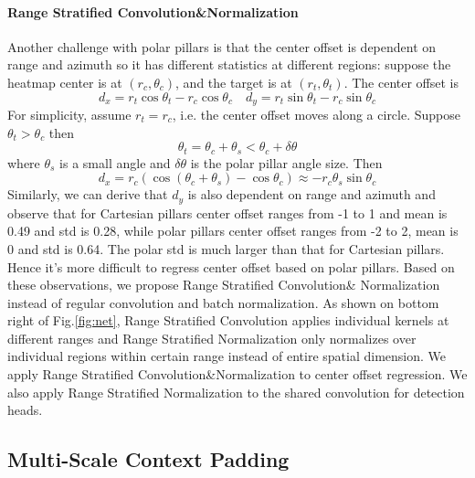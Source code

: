 \documentclass{article}
\begin{document}
\vspace{-3.5mm}\paragraph{Range Stratified Convolution\&Normalization}\label{stratum}
Another challenge with polar pillars is that the center offset is dependent on range and azimuth so it has different statistics at different regions: suppose the heatmap center is at $(r_c, \theta_c)$, and the target is at $(r_t, \theta_t)$. The center offset is 
\vspace{-1mm}\begin{equation}
d_x = r_t \cos \theta_t - r_c \cos \theta_c \quad
d_y = r_t \sin \theta_t - r_c \sin \theta_c
\end{equation}\vspace{-2mm}
For simplicity, assume $r_t = r_c$, i.e. the center offset moves along a circle. Suppose $\theta_t > \theta_c$ then 
\begin{equation}
\theta_t = \theta_c + \theta_s < \theta_c + \delta \theta
\end{equation}
where $\theta_s$ is a small angle and $\delta \theta$ is the polar pillar angle size. Then 
\begin{equation}
d_x = r_c(\cos (\theta_c +\theta_s) - \cos \theta_c) \approx -r_c \theta_s \sin \theta_c
\end{equation}
Similarly, we can derive that $d_y$ is also dependent on range and azimuth and observe that for Cartesian pillars center offset ranges from -1 to 1 and mean is 0.49 and std is 0.28, while polar pillars center offset ranges from -2 to 2, mean is 0 and std is 0.64. The polar std is much larger than that for Cartesian pillars. Hence it's more difficult to regress center offset based on polar pillars. Based on these observations, we propose Range Stratified Convolution\& Normalization instead of regular convolution and batch normalization\cite{ioffe2015batch}. As shown on bottom right of Fig.\ref{fig:net}, Range Stratified Convolution applies individual kernels at different ranges and Range Stratified Normalization only normalizes over individual regions within certain range instead of entire spatial dimension. We apply Range Stratified Convolution\&Normalization to center offset regression. We also apply Range Stratified Normalization to the shared convolution for detection heads.
\vspace{-2mm}\subsection{Multi-Scale Context Padding}\label{sec:padding}
\end{document}
